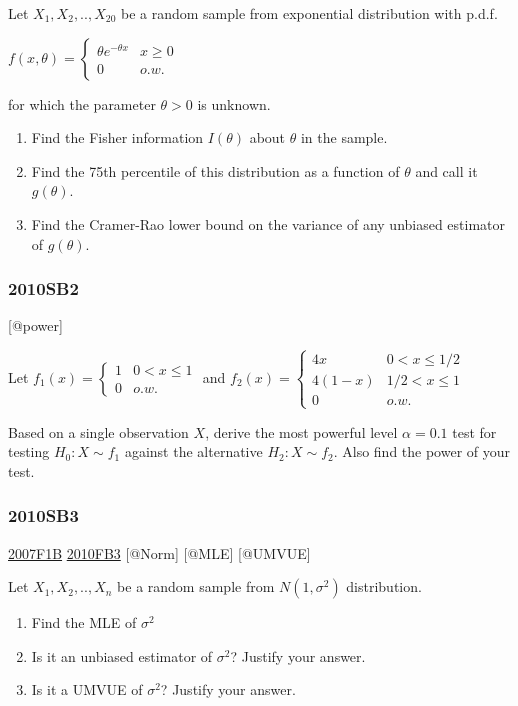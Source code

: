 \documentclass[6pt,Portrait]{article}
\begin{document}
Let \(X_1,X_2,..,X_{20}\) be a random sample from exponential
distribution with p.d.f.

\(f(x,\theta)=\begin{cases}\theta e^{-\theta x}& x\ge0\\0& o.w.\end{cases}\)

for which the parameter \(\theta>0\) is unknown.

\begin{enumerate}
\def\labelenumi{(\alph{enumi})}
\item
  Find the Fisher information \(I(\theta)\) about \(\theta\) in the
  sample.
\item
  Find the 75th percentile of this distribution as a function of
  \(\theta\) and call it \(g(\theta)\).
\item
  Find the Cramer-Rao lower bound on the variance of any unbiased
  estimator of \(g(\theta)\).
\end{enumerate}

\hypertarget{sb2-1}{%
\subsubsection{2010SB2}\label{sb2-1}}

{[}@power{]}

Let \(f_1(x)=\begin{cases}1&0<x\le1\\0& o.w.\end{cases}\) and
\(f_2(x)=\begin{cases}4x&0<x\le1/2\\4(1-x)& 1/2<x\le1\\0& o.w.\end{cases}\)

Based on a single observation \(X\), derive the most powerful level
\(\alpha=0.1\) test for testing \(H_0:X\sim f_1\) against the
alternative \(H_2:X\sim f_2\). Also find the power of your test.

\hypertarget{sb3-1}{%
\subsubsection{2010SB3}\label{sb3-1}}

\protect\hyperlink{f1b}{2007F1B} \protect\hyperlink{fb3-1}{2010FB3}
{[}@Norm{]} {[}@MLE{]} {[}@UMVUE{]}

Let \(X_1,X_2,..,X_n\) be a random sample from \(N(1,\sigma^2)\)
distribution.

\begin{enumerate}
\def\labelenumi{(\alph{enumi})}
\item
  Find the MLE of \(\sigma^2\)
\item
  Is it an unbiased estimator of \(\sigma^2\)? Justify your answer.
\item
  Is it a UMVUE of \(\sigma^2\)? Justify your answer.
\end{enumerate}
\end{document}

